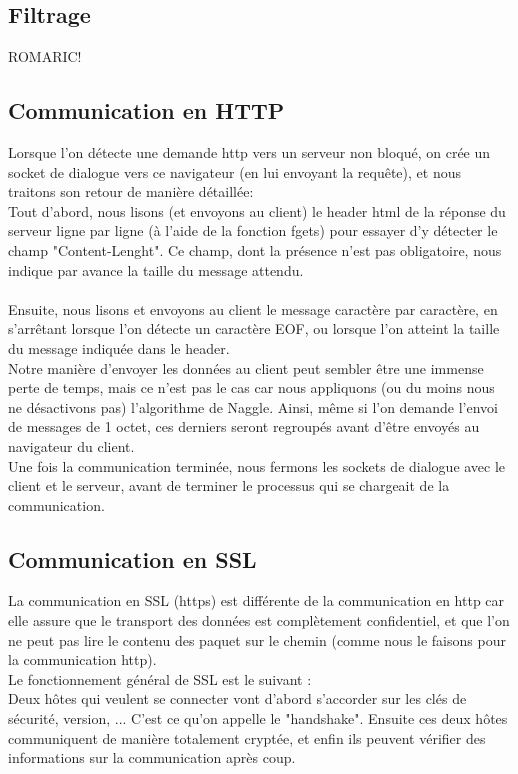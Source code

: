 \documentclass{scrreprt}
\begin{document}
\subsection{Filtrage}
ROMARIC!
\subsection{Communication en HTTP}

Lorsque l'on détecte une demande http vers un serveur non bloqué, on crée un socket de dialogue vers ce navigateur (en lui envoyant la requête), et nous traitons son retour de manière détaillée:\\
Tout d'abord, nous lisons (et envoyons au client) le header html de la réponse du serveur ligne par ligne (à l'aide de la fonction fgets) pour essayer d'y détecter le champ "Content-Lenght". Ce champ, dont la présence n'est pas obligatoire, nous indique par avance la taille du message attendu.\\\\
Ensuite, nous lisons et envoyons au client le message caractère par caractère, en s'arrêtant lorsque l'on détecte un caractère EOF, ou lorsque l'on atteint la taille du message indiquée dans le header.\\
Notre manière d'envoyer les données au client peut sembler être une immense perte de temps, mais ce n'est pas le cas car nous appliquons (ou du moins nous ne désactivons pas) l'algorithme de Naggle. Ainsi, même si l'on demande l'envoi de messages de 1 octet, ces derniers seront regroupés avant d'être envoyés au navigateur du client.\\
Une fois la communication terminée, nous fermons les sockets de dialogue avec le client et le serveur, avant de terminer le processus qui se chargeait de la communication.
\subsection{Communication en SSL}

La communication en SSL (https) est différente de la communication en http car elle assure que le transport des données est complètement confidentiel, et que l'on ne peut pas lire le contenu des paquet sur le chemin (comme nous le faisons pour la communication http).\\ Le fonctionnement général de SSL est le suivant : \\
Deux hôtes qui veulent se connecter vont d'abord s'accorder sur les clés de sécurité, version, ... C'est ce qu'on appelle le "handshake". Ensuite ces deux hôtes communiquent de manière totalement cryptée, et enfin ils peuvent vérifier des informations sur la communication après coup.\\\\
\end{document}
